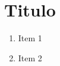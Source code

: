 \apendices


\chapter{Titulo}

\begin{enumerate}
    \item Item 1
    \item Item 2
\end{enumerate}



